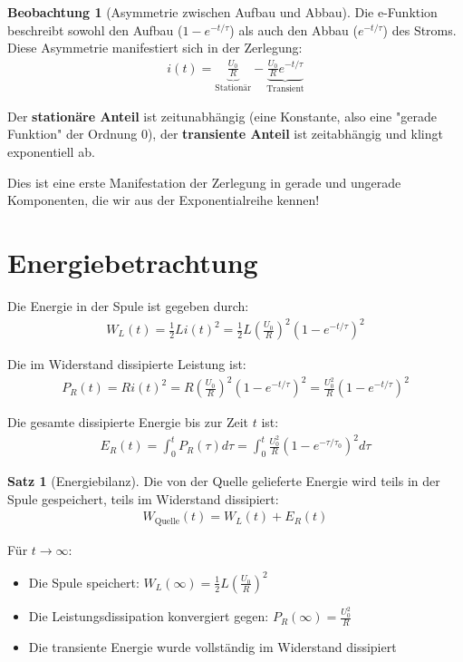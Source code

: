 ﻿\documentclass[a4paper,12pt]{report}
\theoremstyle{definition}
\newtheorem{satz}{Satz}
\newtheorem{beobachtung}{Beobachtung}
\begin{document}
	\begin{beobachtung}[Asymmetrie zwischen Aufbau und Abbau]
		Die e-Funktion beschreibt sowohl den Aufbau ($1 - e^{-t/\tau}$) als auch den Abbau ($e^{-t/\tau}$) des Stroms. Diese Asymmetrie manifestiert sich in der Zerlegung:
		\begin{align}
			i(t) = \underbrace{\frac{U_0}{R}}_{\text{Stationär}} - \underbrace{\frac{U_0}{R} e^{-t/\tau}}_{\text{Transient}}
		\end{align}
		
		Der \textbf{stationäre Anteil} ist zeitunabhängig (eine Konstante, also eine "gerade Funktion" der Ordnung 0), der \textbf{transiente Anteil} ist zeitabhängig und klingt exponentiell ab.
		
		Dies ist eine erste Manifestation der Zerlegung in gerade und ungerade Komponenten, die wir aus der Exponentialreihe kennen!
	\end{beobachtung}
	
	\section{Energiebetrachtung}
	
	Die Energie in der Spule ist gegeben durch:
	\begin{align}
		W_L(t) = \frac{1}{2} L i(t)^2 = \frac{1}{2} L \left(\frac{U_0}{R}\right)^2 \left(1 - e^{-t/\tau}\right)^2
	\end{align}
	
	Die im Widerstand dissipierte Leistung ist:
	\begin{align}
		P_R(t) = R i(t)^2 = R \left(\frac{U_0}{R}\right)^2 \left(1 - e^{-t/\tau}\right)^2 = \frac{U_0^2}{R} \left(1 - e^{-t/\tau}\right)^2
	\end{align}
	
	Die gesamte dissipierte Energie bis zur Zeit $t$ ist:
	\begin{align}
		E_R(t) = \int_0^t P_R(\tau) d\tau = \int_0^t \frac{U_0^2}{R} \left(1 - e^{-\tau/\tau_0}\right)^2 d\tau
	\end{align}
	
	\begin{satz}[Energiebilanz]
		Die von der Quelle gelieferte Energie wird teils in der Spule gespeichert, teils im Widerstand dissipiert:
		\begin{align}
			W_{\text{Quelle}}(t) = W_L(t) + E_R(t)
		\end{align}
		
		Für $t \to \infty$:
		\begin{itemize}
			\item[-] Die Spule speichert: $W_L(\infty) = \frac{1}{2} L \left(\frac{U_0}{R}\right)^2$
			\item[-] Die Leistungsdissipation konvergiert gegen: $P_R(\infty) = \frac{U_0^2}{R}$
			\item[-] Die transiente Energie wurde vollständig im Widerstand dissipiert
		\end{itemize}
	\end{satz}
	
\end{document}
